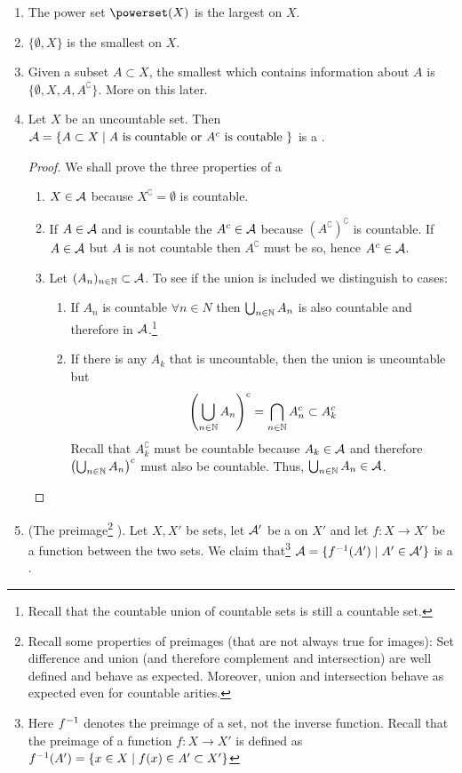 \begin{eg}$ $\newline
	\begin{enumerate}
		\item The power set $\powerset (X)$ is the largest \siga on $X$.
		\item $\{\emptyset, X\}$ is the smallest \siga on $X$.
		\item Given a subset $A \subset X$, the smallest \siga which contains information about $A$ is $\{\emptyset, X, A, A^\complement\}$. More on this later.
		\item Let $X$ be an uncountable set. Then $\mathcal{A} = \{ A \subset X \mid A \text{ is countable or } A^c \text{ is coutable }\}$ is a \siga.
		
		\begin{proof} We shall prove the three properties of a \siga
			\begin{enumerate}
				\item $X \in \mathcal{A}$ because $X^\complement = \emptyset$ is countable.
				\item If $A \in \mathcal{A}$ and is countable the $A^c \in \mathcal{A}$ because $(A^\complement)^\complement$ is countable. If $A \in \mathcal{A}$ but $A$ is not countable then $A^\complement$ must be so, hence $A^c \in \mathcal{A}$.
				\item Let $(A_n)_{n \in \mathbb{N}} \subset \mathcal{A}$. To see if the union is included we distinguish to cases:
				\begin{enumerate}
					\item If $A_n$ is countable $\forall n \in N$ then $\bigcup_{n \in \mathbb{N}} A_n$ is also countable and therefore in $\mathcal{A}$.\footnote{Recall that the countable union of countable sets is still a countable set.}
					\item If there is any $A_k$ that is uncountable, then the union is uncountable but
					\begin{align*}
						\left(\bigcup_{n \in \mathbb{N}} A_n\right)^c = \bigcap_{n \in \mathbb{N}} A_n^c \subset A_k^c
					\end{align*}
					Recall that $A_k^\complement$ must be countable because $A_k \in \mathcal{A}$ and therefore $\left(\bigcup_{n \in \mathbb{N}} A_n\right)^c$ must also be countable. Thus, $\bigcup_{n \in \mathbb{N}} A_n \in \mathcal{A}$.
				\end{enumerate}
			\end{enumerate}
		\end{proof}
		\item (The preimage\footnote{Recall some properties of preimages (that are not always true for images): Set difference and union (and therefore complement and intersection) are well defined and behave as expected. Moreover, union and intersection behave as expected even for countable arities.} \siga). Let $X, X'$ be sets, let $\mathcal{A}'$ be a \siga on $X'$ and let $f : X \to X'$ be a function between the two sets. We claim that\footnote{Here $f^{-1}$ denotes the preimage of a set, not the inverse function. Recall that the preimage of a function $f: X \to X'$ is defined as $f^{-1}(A') = \{x \in X \mid f(x) \in A' \subset X'\}$} $\mathcal{A} = \{f^{-1} (A') \mid A' \in \mathcal{A}'\}$ is a \siga.

\end{enumerate}
\end{eg}
